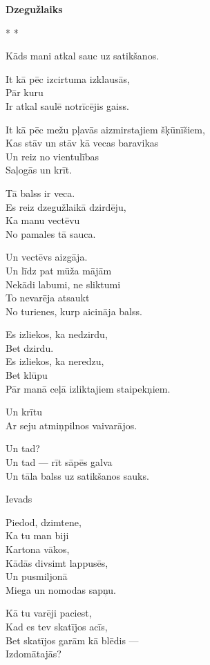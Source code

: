\documentclass[14pt]{extarticle}
\begin{document}
\begin{center}
{\LARGE \bf Dzegužlaiks}
\end{center}


{\large \sc * * *}

Kāds mani atkal sauc uz satikšanos. 

It kā pēc izcirtuma izklausās,\\
Pār kuru\\
Ir atkal saulē notrīcējis gaiss. 

It kā pēc mežu pļavās aizmirstajiem šķūnīšiem,\\
Kas stāv un stāv kā vecas baravikas\\
Un reiz no vientulības\\
Saļogās un krīt. 

Tā balss ir veca.\\
Es reiz dzegužlaikā dzirdēju,\\
Ka manu vectēvu\\
No pamales tā sauca. 

Un vectēvs aizgāja.\\
Un līdz pat mūža mājām\\
Nekādi labumi, ne sliktumi\\
To nevarēja atsaukt\\
No turienes, kurp aicināja balss.

Es izliekos, ka nedzirdu,\\
Bet dzirdu.\\
Es izliekos, ka neredzu,\\
Bet klūpu\\
Pār manā ceļā izliktajiem staipekņiem. 

Un krītu\\
Ar seju atmiņpilnos vaivarājos.

Un tad?\\
Un tad --- rīt sāpēs galva\\
Un tāla balss uz satikšanos sauks. 


\newpage

{\large \sc Ievads}

Piedod, dzimtene,\\
Ka tu man biji\\
Kartona vākos,\\
Kādās divsimt lappusēs,\\
Un pusmiljonā\\
Miega un nomodas sapņu.

Kā tu varēji paciest,\\
Kad es tev skatījos acīs,\\
Bet skatījos garām kā blēdis ---\\
Izdomātajās?
\end{document}
